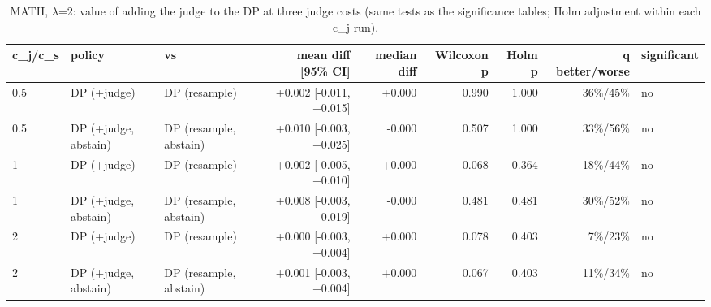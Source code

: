 \begin{table}[t]
\centering
\small
\caption{MATH, $\lambda$=2: value of adding the judge to the DP at three judge costs (same tests as the significance tables; Holm adjustment within each c\_j run).}
\label{tab:judge_value_math}
\begin{tabular}{lllrrrrrl}
\toprule
c\_j/c\_s & policy & vs & mean diff [95\% CI] & median diff & Wilcoxon p & Holm p & q better/worse & significant \\
\midrule
0.5 & DP (+judge) & DP (resample) & +0.002 [-0.011, +0.015] & +0.000 & 0.990 & 1.000 & 36\%/45\% & no \\
0.5 & DP (+judge, abstain) & DP (resample, abstain) & +0.010 [-0.003, +0.025] & -0.000 & 0.507 & 1.000 & 33\%/56\% & no \\
1 & DP (+judge) & DP (resample) & +0.002 [-0.005, +0.010] & +0.000 & 0.068 & 0.364 & 18\%/44\% & no \\
1 & DP (+judge, abstain) & DP (resample, abstain) & +0.008 [-0.003, +0.019] & -0.000 & 0.481 & 0.481 & 30\%/52\% & no \\
2 & DP (+judge) & DP (resample) & +0.000 [-0.003, +0.004] & +0.000 & 0.078 & 0.403 & 7\%/23\% & no \\
2 & DP (+judge, abstain) & DP (resample, abstain) & +0.001 [-0.003, +0.004] & +0.000 & 0.067 & 0.403 & 11\%/34\% & no \\
\bottomrule
\end{tabular}
\end{table}
